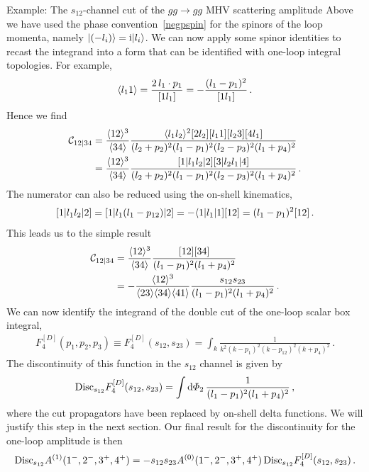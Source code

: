 \begin{example}{Example: The $s_{12}$-channel cut of the $gg\to gg$ MHV scattering amplitude}
Above we have used the phase convention~\eqref{negpspin} for the spinors of the loop momenta, namely $|(-l_i)\rangle = \mathrm{i} |l_i\rangle$.
We can now apply some spinor identities to recast the integrand into a form that
can be identified with one-loop integral topologies. For example,
\begin{equation}
  \langle l_1 1 \rangle = \frac{2 \, l_1\cdot p_1}{[ 1 l_1 ]} = -\frac{(l_1-p_1)^2}{[ 1 l_1 ]} \,.
\end{equation}
Hence we find
\begin{align}
  \mathcal{C}_{12|34} &= \frac{\langle 1 2 \rangle^3}{\langle 3 4 \rangle} \frac{\langle l_1 l_2 \rangle^2 [ 2 l_2 ][ l_1 1 ][ l_2 3 ][ 4 l_1 ]}{(l_2+p_2)^2 (l_1-p_1)^2 (l_2-p_3)^2(l_1+p_4)^2} \nonumber\\
  &= \frac{\langle 1 2 \rangle^3}{\langle 3 4 \rangle} \frac{[ 1 | l_1 l_2 | 2 ][ 3 | l_2 l_1 | 4 ]}{(l_2+p_2)^2 (l_1-p_1)^2 (l_2-p_3)^2(l_1+p_4)^2} \,.
\end{align}
The numerator can also be reduced using the on-shell kinematics,
\begin{equation}
  [ 1 | l_1 l_2 | 2 ] = [ 1 | l_1 (l_1-p_{12}) | 2 ] = -\langle 1 | l_1 | 1 ][ 1 2 ] = (l_1-p_1)^2 [ 1 2 ] \,.
\end{equation}
This leads us to the simple result
\begin{align}
  \mathcal{C}_{12|34} &= \frac{\langle 1 2 \rangle^3}{\langle 3 4 \rangle} \frac{[ 1 2 ][ 3 4 ]}{(l_1-p_1)^2 (l_1+p_4)^2} \nonumber\\
  &= -\frac{\langle 1 2 \rangle^3}{\langle 2 3 \rangle\langle 3 4 \rangle\langle 4 1 \rangle} \frac{s_{12}s_{23}}{(l_1-p_1)^2 (l_1+p_4)^2} \,.
\end{align}
We can now identify the integrand of the double cut of the one-loop scalar box integral,
\begin{align}
  F_4^{[D]}(p_1, p_2, p_3) \equiv F_4^{[D]}(s_{12}, s_{23}) = \int_k \frac{1}{k^2 (k-p_1)^2  (k-p_{12})^2 (k+p_4)^2 } \,.
\end{align}
The discontinuity of this function in the $s_{12}$ channel is given by 
\begin{align}
  {\rm Disc}_{s_{12}} F_4^{[D]}(s_{12}, s_{23}) = \int \d\Phi_2 \, \frac{1}{(l_1-p_1)^2 (l_1+p_4)^2 } \,,
\end{align}
where the cut propagators have been replaced by on-shell delta functions. We
will justify this step in the next section. Our final
result for the discontinuity for the one-loop amplitude is then
\begin{align}
  {\rm Disc}_{s_{12}} A^{(1)}(1^-,2^-,3^+,4^+) = - s_{12} s_{23} A^{(0)}(1^-,2^-,3^+,4^+) \, {\rm Disc}_{s_{12}} F_4^{[D]}(s_{12}, s_{23}) \,.
\end{align}
\end{example}

